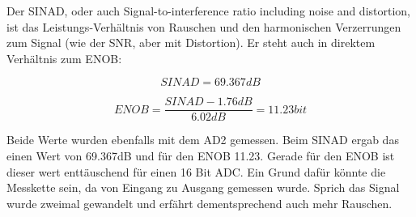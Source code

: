 Der SINAD, oder auch \glqq Signal-to-interference ratio including noise and distortion\grqq , ist das Leistungs-Verhältnis  von Rauschen und den harmonischen Verzerrungen zum Signal (wie der SNR, aber mit Distortion). Er steht auch in direktem Verhältnis zum ENOB:

\begin{equation}
SINAD=69.367\si{dB}
\end{equation} 

\begin{equation}
ENOB=\frac{SINAD-1.76dB}{6.02dB}=11.23\si{bit}
\end{equation} 

Beide Werte wurden ebenfalls mit dem AD2 gemessen. Beim SINAD ergab das einen Wert von 69.367dB und für den ENOB 11.23. Gerade für den ENOB ist dieser wert enttäuschend für einen 16 Bit ADC. Ein Grund dafür könnte die Messkette sein, da von Eingang zu Ausgang gemessen wurde. Sprich das Signal wurde zweimal gewandelt und erfährt dementsprechend auch mehr Rauschen. 